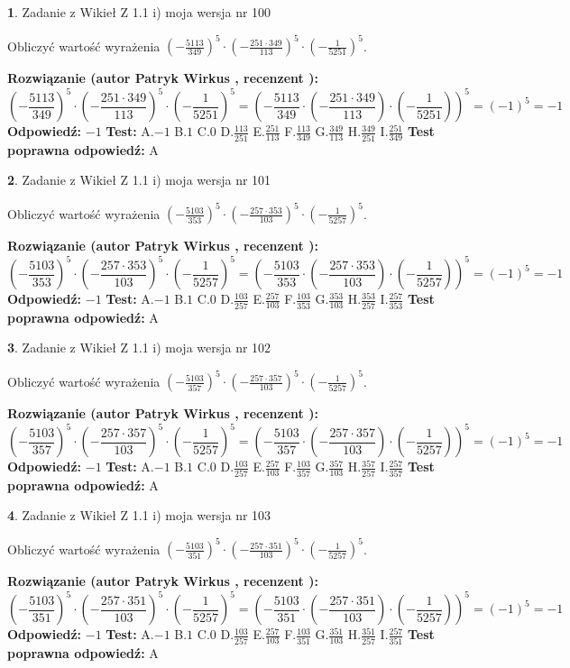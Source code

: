 \documentclass[12pt, a4paper]{article}
\theoremstyle{definition} %
\newtheorem{zad}{}
\newcommand{\zadStart}[1]{\begin{zad}#1\newline}
\newcommand{\zadStop}{\end{zad}}
\newcommand{\rozwStart}[2]{\noindent \textbf{Rozwiązanie (autor #1 , recenzent #2): }\newline}
\newcommand{\rozwStop}{\newline}
\newcommand{\odpStart}{\noindent \textbf{Odpowiedź:}\newline}
\newcommand{\odpStop}{\newline}
\newcommand{\testStart}{\noindent \textbf{Test:}\newline}
\newcommand{\testStop}{\newline}
\newcommand{\kluczStart}{\noindent \textbf{Test poprawna odpowiedź:}\newline}
\newcommand{\kluczStop}{\newline}
\begin{document}
\zadStart{Zadanie z Wikieł Z 1.1 i) moja wersja nr 100}

Obliczyć wartość wyrażenia $(-\frac{5113}{349})^{5} \cdot (-\frac{251 \cdot 349}{113})^{5} \cdot (-\frac{1}{5251})^{5}$.
\zadStop
\rozwStart{Patryk Wirkus}{}
$$(-\frac{5113}{349})^{5} \cdot (-\frac{251 \cdot 349}{113})^{5} \cdot (-\frac{1}{5251})^{5} = (-\frac{5113}{349} \cdot (-\frac{251 \cdot 349}{113}) \cdot (-\frac{1}{5251}))^{5} = (-1)^{5} = -1$$
\rozwStop
\odpStart
$-1$
\odpStop
\testStart
A.$-1$ B.$1$ C.$0$ D.$\frac{113}{251}$ E.$\frac{251}{113}$
F.$\frac{113}{349}$ G.$\frac{349}{113}$
H.$\frac{349}{251}$
I.$\frac{251}{349}$
\testStop
\kluczStart
A
\kluczStop



\zadStart{Zadanie z Wikieł Z 1.1 i) moja wersja nr 101}

Obliczyć wartość wyrażenia $(-\frac{5103}{353})^{5} \cdot (-\frac{257 \cdot 353}{103})^{5} \cdot (-\frac{1}{5257})^{5}$.
\zadStop
\rozwStart{Patryk Wirkus}{}
$$(-\frac{5103}{353})^{5} \cdot (-\frac{257 \cdot 353}{103})^{5} \cdot (-\frac{1}{5257})^{5} = (-\frac{5103}{353} \cdot (-\frac{257 \cdot 353}{103}) \cdot (-\frac{1}{5257}))^{5} = (-1)^{5} = -1$$
\rozwStop
\odpStart
$-1$
\odpStop
\testStart
A.$-1$ B.$1$ C.$0$ D.$\frac{103}{257}$ E.$\frac{257}{103}$
F.$\frac{103}{353}$ G.$\frac{353}{103}$
H.$\frac{353}{257}$
I.$\frac{257}{353}$
\testStop
\kluczStart
A
\kluczStop



\zadStart{Zadanie z Wikieł Z 1.1 i) moja wersja nr 102}

Obliczyć wartość wyrażenia $(-\frac{5103}{357})^{5} \cdot (-\frac{257 \cdot 357}{103})^{5} \cdot (-\frac{1}{5257})^{5}$.
\zadStop
\rozwStart{Patryk Wirkus}{}
$$(-\frac{5103}{357})^{5} \cdot (-\frac{257 \cdot 357}{103})^{5} \cdot (-\frac{1}{5257})^{5} = (-\frac{5103}{357} \cdot (-\frac{257 \cdot 357}{103}) \cdot (-\frac{1}{5257}))^{5} = (-1)^{5} = -1$$
\rozwStop
\odpStart
$-1$
\odpStop
\testStart
A.$-1$ B.$1$ C.$0$ D.$\frac{103}{257}$ E.$\frac{257}{103}$
F.$\frac{103}{357}$ G.$\frac{357}{103}$
H.$\frac{357}{257}$
I.$\frac{257}{357}$
\testStop
\kluczStart
A
\kluczStop



\zadStart{Zadanie z Wikieł Z 1.1 i) moja wersja nr 103}

Obliczyć wartość wyrażenia $(-\frac{5103}{351})^{5} \cdot (-\frac{257 \cdot 351}{103})^{5} \cdot (-\frac{1}{5257})^{5}$.
\zadStop
\rozwStart{Patryk Wirkus}{}
$$(-\frac{5103}{351})^{5} \cdot (-\frac{257 \cdot 351}{103})^{5} \cdot (-\frac{1}{5257})^{5} = (-\frac{5103}{351} \cdot (-\frac{257 \cdot 351}{103}) \cdot (-\frac{1}{5257}))^{5} = (-1)^{5} = -1$$
\rozwStop
\odpStart
$-1$
\odpStop
\testStart
A.$-1$ B.$1$ C.$0$ D.$\frac{103}{257}$ E.$\frac{257}{103}$
F.$\frac{103}{351}$ G.$\frac{351}{103}$
H.$\frac{351}{257}$
I.$\frac{257}{351}$
\testStop
\kluczStart
A
\kluczStop
\end{document}
